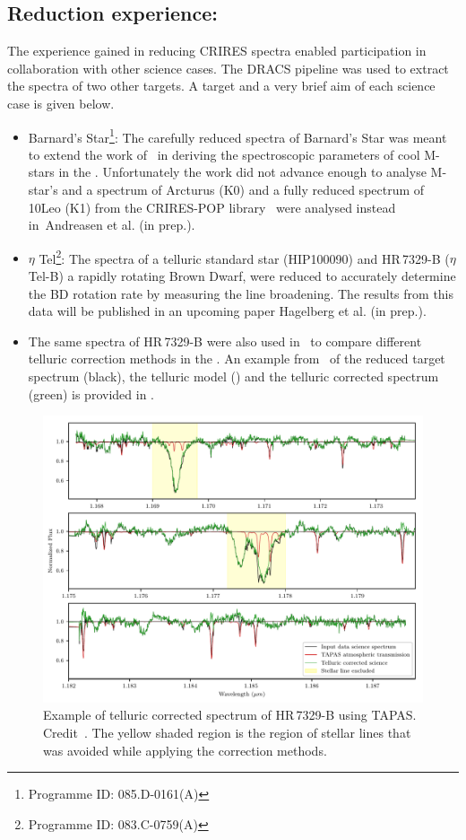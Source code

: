 \subsection{Reduction experience:}
\label{subsec:experience}
The experience gained in reducing {CRIRES} spectra enabled participation in collaboration with other science cases.
The {DRACS} pipeline was used to extract the spectra of two other targets.
A target and a very brief aim of each science case is given below.
\begin{itemize}
\item Barnard's Star\footnote{Programme {{ID}}: 085.D-0161(A)}: The carefully reduced \nir{} spectra of Barnard's Star was meant to extend the work of~\citet{andreasen_nearinfrared_2016} in deriving the spectroscopic parameters of cool M-stars in the \nir{}.
Unfortunately the work did not advance enough to analyse M-star's and a spectrum of {Arcturus} (K0) and a fully reduced spectrum of {10Leo} (K1) from the {CRIRES}-POP library~\cite{nicholls_crirespop_2017} were analysed instead in~{Andreasen et al. (in prep.)}.
\item \(\eta\) Tel\footnote{Programme {{ID}}: 083.C-0759(A)}: The spectra of a telluric standard star (HIP100090) and {HR\,7329-B} (\(\eta\) Tel-B) a rapidly rotating Brown Dwarf, were reduced to accurately determine the BD rotation rate by measuring the line broadening.
The results from this data will be published in an upcoming paper Hagelberg et al. (in prep.).
\item The same spectra of {HR\,7329-B} were also used in~\citet{ulmer-moll_telluric_2018} to compare different telluric correction methods in the \nir{}.
An example from~\citet[][(B.3)]{ulmer-moll_telluric_2018} of the reduced target spectrum (black), the telluric model () and the telluric corrected spectrum (green) is provided in .
\end{itemize}

\begin{figure}
    \centering
    \includegraphics[width=0.7\linewidth]{figures/reduction/ulmermol2018_tell_corr_CRIRES_48}
    \caption{Example of telluric corrected spectrum of {HR\,7329-B} using TAPAS.
Credit~\citet[][]{ulmer-moll_telluric_2018}.
The yellow shaded region is the region of stellar lines that was avoided while applying the correction methods.}
    \label{fig:ulmermol2018tellcorrcrires48}
\end{figure}

